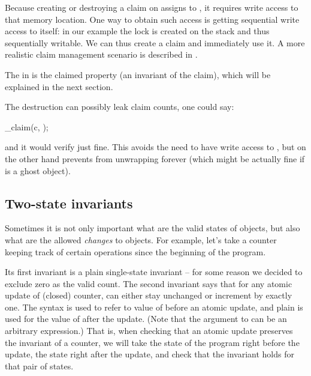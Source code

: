 Because creating or destroying a claim on  assigns to
, it requires write access to that memory location.
One way to obtain such access is getting sequential write access to  itself:
in our example the lock is created on the stack and thus sequentially writable.
We can thus create a claim and immediately use it.
A more realistic claim management scenario is described in .

The \vcc{\true} in  is the claimed property (an invariant
of the claim), which will be explained in the next section.

\begin{note}
The destruction can possibly leak claim counts, \ie one could say:
\begin{VCC}
\destroy_claim(c, {});
\end{VCC}
\noindent
and it would verify just fine.
This avoids the need to have write access to , but on the other hand prevents
 from unwrapping forever (which might be actually fine if  is a ghost object).
\end{note}

\subsection{Two-state invariants}
\label{sect:inv2}

Sometimes it is not only important what are the valid states of objects,
but also what are the allowed \emph{changes} to objects.
For example, let's take a counter keeping track of certain operations
since the beginning of the program.


\noindent
Its first invariant is a plain single-state invariant -- for some reason
we decided to exclude zero as the valid count.
The second invariant says that for any atomic update of (closed)
counter,  can either stay unchanged or increment by exactly one.
The syntax  is used to refer to value of  before
an atomic update, and plain  is used for the value of 
after the update.
(Note that the argument to  can be an arbitrary expression.)
That is, when checking that an atomic update preserves the invariant
of a counter, we will take the state of the program right
before the update, the state right after the update, and check
that the invariant holds for that pair of states.

